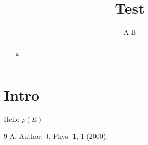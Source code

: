 \documentclass[reprint,nofootinbib,superscriptaddress,amsmath,amssymb,aps,prb]{revtex4-2}
\begin{document}
\title{Test}\author{A B}
\begin{abstract}x\end{abstract}\maketitle
\section{Intro} Hello $\rho(E)$ \cite{a}
\begin{thebibliography}{9} A. Author, J. Phys. \textbf{1}, 1 (2000).\end{thebibliography}
\end{document}
